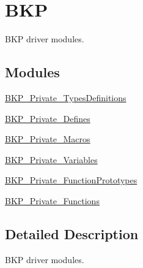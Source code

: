 \hypertarget{group___b_k_p}{\section{B\-K\-P}
\label{group___b_k_p}
}


B\-K\-P driver modules.  


\subsection*{Modules}
\begin{DoxyCompactItemize}
\item 
\hyperlink{group___b_k_p___private___types_definitions}{B\-K\-P\-\_\-\-Private\-\_\-\-Types\-Definitions}
\item 
\hyperlink{group___b_k_p___private___defines}{B\-K\-P\-\_\-\-Private\-\_\-\-Defines}
\item 
\hyperlink{group___b_k_p___private___macros}{B\-K\-P\-\_\-\-Private\-\_\-\-Macros}
\item 
\hyperlink{group___b_k_p___private___variables}{B\-K\-P\-\_\-\-Private\-\_\-\-Variables}
\item 
\hyperlink{group___b_k_p___private___function_prototypes}{B\-K\-P\-\_\-\-Private\-\_\-\-Function\-Prototypes}
\item 
\hyperlink{group___b_k_p___private___functions}{B\-K\-P\-\_\-\-Private\-\_\-\-Functions}
\end{DoxyCompactItemize}


\subsection{Detailed Description}
B\-K\-P driver modules. 